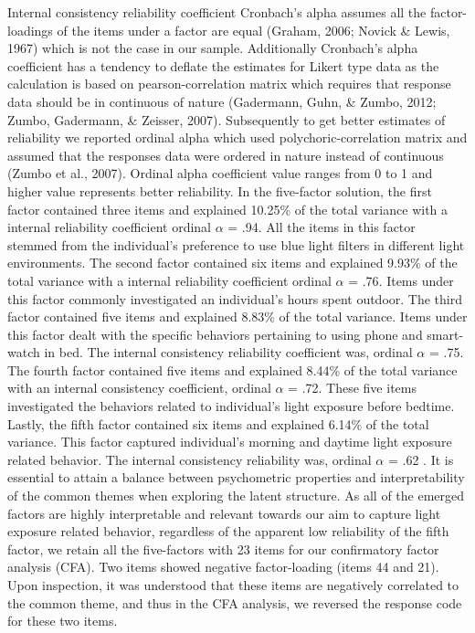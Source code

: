 \documentclass[
  english,
  man]{apa6}
\begin{document}
Internal consistency reliability coefficient Cronbach's alpha assumes all the factor-loadings of the items under a factor are equal (Graham, 2006; Novick \& Lewis, 1967) which is not the case in our sample. Additionally Cronbach's alpha coefficient has a tendency to deflate the estimates for Likert type data as the calculation is based on pearson-correlation matrix which requires that response data should be in continuous of nature (Gadermann, Guhn, \& Zumbo, 2012; Zumbo, Gadermann, \& Zeisser, 2007). Subsequently to get better estimates of reliability we reported ordinal alpha which used polychoric-correlation matrix and assumed that the responses data were ordered in nature instead of continuous (Zumbo et al., 2007). Ordinal alpha coefficient value ranges from 0 to 1 and higher value represents better reliability. In the five-factor solution, the first factor contained three items and explained 10.25\% of the total variance with a internal reliability coefficient ordinal \(\alpha\) = .94. All the items in this factor stemmed from the individual's preference to use blue light filters in different light environments. The second factor contained six items and explained 9.93\% of the total variance with a internal reliability coefficient ordinal \(\alpha\) = .76. Items under this factor commonly investigated an individual's hours spent outdoor. The third factor contained five items and explained 8.83\% of the total variance. Items under this factor dealt with the specific behaviors pertaining to using phone and smart-watch in bed. The internal consistency reliability coefficient was, ordinal \(\alpha\) = .75. The fourth factor contained five items and explained 8.44\% of the total variance with an internal consistency coefficient, ordinal \(\alpha\) = .72. These five items investigated the behaviors related to individual's light exposure before bedtime. Lastly, the fifth factor contained six items and explained 6.14\% of the total variance. This factor captured individual's morning and daytime light exposure related behavior. The internal consistency reliability was, ordinal \(\alpha\) = .62 . It is essential to attain a balance between psychometric properties and interpretability of the common themes when exploring the latent structure. As all of the emerged factors are highly interpretable and relevant towards our aim to capture light exposure related behavior, regardless of the apparent low reliability of the fifth factor, we retain all the five-factors with 23 items for our confirmatory factor analysis (CFA). Two items showed negative factor-loading (items 44 and 21). Upon inspection, it was understood that these items are negatively correlated to the common theme, and thus in the CFA analysis, we reversed the response code for these two items.
\end{document}
